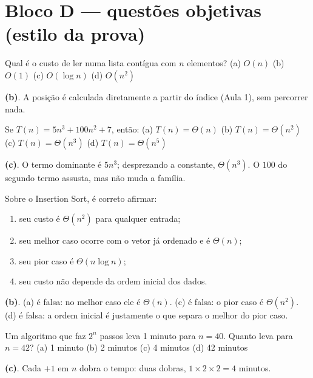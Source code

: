 \section{Bloco D — questões objetivas (estilo da prova)}

Qual é o custo de ler  numa lista contígua com $n$ elementos?
\quad (a) $O(n)$ \quad (b) $O(1)$ \quad (c) $O(\log n)$ \quad (d) $O(n^2)$
\begin{resolucao}
\textbf{(b)}. A posição é calculada diretamente a partir do índice (Aula 1), sem percorrer nada.
\end{resolucao}

Se $T(n) = 5n^3 + 100n^2 + 7$, então:
\quad (a) $T(n) = \Theta(n)$ \quad (b) $T(n) = \Theta(n^2)$ \quad (c) $T(n) = \Theta(n^3)$ \quad (d) $T(n) = \Theta(n^5)$
\begin{resolucao}
\textbf{(c)}. O termo dominante é $5n^3$; desprezando a constante, $\Theta(n^3)$. O $100$ do
segundo termo assusta, mas não muda a família.
\end{resolucao}

Sobre o Insertion Sort, é correto afirmar:
\begin{enumerate}[label=(\alph*), leftmargin=2em]
  \item seu custo é $\Theta(n^2)$ para qualquer entrada;
  \item seu melhor caso ocorre com o vetor já ordenado e é $\Theta(n)$;
  \item seu pior caso é $\Theta(n \log n)$;
  \item seu custo não depende da ordem inicial dos dados.
\end{enumerate}
\begin{resolucao}
\textbf{(b)}. (a) é falsa: no melhor caso ele é $\Theta(n)$. (c) é falsa: o pior caso é
$\Theta(n^2)$. (d) é falsa: a ordem inicial é justamente o que separa o melhor do pior caso.
\end{resolucao}

Um algoritmo que faz $2^n$ passos leva 1 minuto para $n = 40$. Quanto leva para $n = 42$?
\quad (a) 1 minuto \quad (b) 2 minutos \quad (c) 4 minutos \quad (d) 42 minutos
\begin{resolucao}
\textbf{(c)}. Cada $+1$ em $n$ dobra o tempo: duas dobras, $1 \times 2 \times 2 = 4$ minutos.
\end{resolucao}

